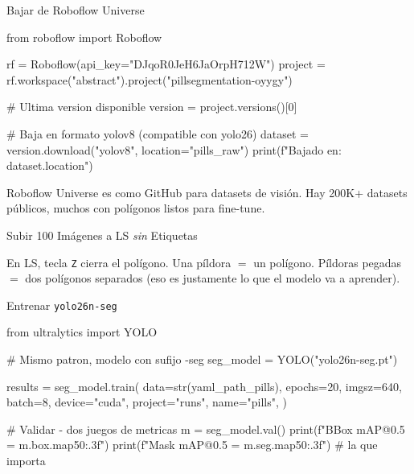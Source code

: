 \documentclass[aspectratio=169, 11pt]{beamer}
\begin{document}
\begin{frame}{Bajar de Roboflow Universe}
  \vspace{-4pt}
  \begin{pyblock}
from roboflow import Roboflow

rf = Roboflow(api_key="DJqoR0JeH6JaOrpH712W")
project = rf.workspace("abstract").project("pillsegmentation-oyygy")

# Ultima version disponible
version = project.versions()[0]

# Baja en formato yolov8 (compatible con yolo26)
dataset = version.download("yolov8", location="pills_raw")
print(f"Bajado en: {dataset.location}")
  \end{pyblock}

  \vspace{4pt}
  {\scriptsize\color{textMuted}
    \faLightbulb\hspace{4pt} Roboflow Universe es como GitHub para datasets
    de visi\'on. Hay 200K+ datasets p\'ublicos, muchos con polígonos
    listos para fine-tune.}
\end{frame}

\begin{frame}{Subir 100 Im\'agenes a LS \emph{sin} Etiquetas}
  \vspace{-4pt}

  \vspace{4pt}
  {\scriptsize\color{textMuted}
    \faLightbulb\hspace{4pt} En LS, tecla \texttt{Z} cierra el pol\'igono.
    Una p\'ildora $=$ un pol\'igono. P\'ildoras pegadas $=$ dos pol\'igonos
    separados (eso es justamente lo que el modelo va a aprender).}
\end{frame}

\begin{frame}{Entrenar \texttt{yolo26n-seg}}
  \vspace{-4pt}
  \begin{pyblock}
from ultralytics import YOLO

# Mismo patron, modelo con sufijo -seg
seg_model = YOLO("yolo26n-seg.pt")

results = seg_model.train(
    data=str(yaml_path_pills),
    epochs=20,
    imgsz=640,
    batch=8,
    device="cuda",
    project="runs", name="pills",
)

# Validar - dos juegos de metricas
m = seg_model.val()
print(f"BBox mAP@0.5 = {m.box.map50:.3f}")
print(f"Mask mAP@0.5 = {m.seg.map50:.3f}")   # la que importa
  \end{pyblock}
\end{frame}
\end{document}
